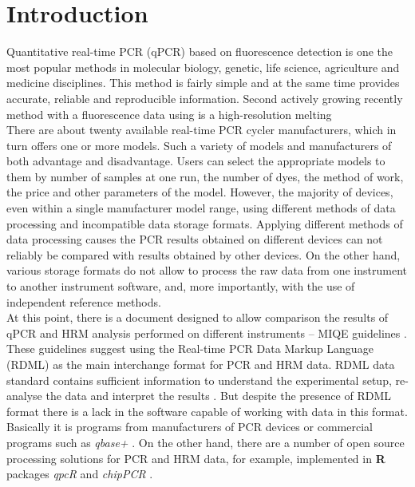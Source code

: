 \documentclass{bioinfo}
\begin{document}
\section{Introduction}

Quantitative real-time PCR (qPCR) based on fluorescence detection is one the 
most popular methods in molecular biology, genetic, life science, agriculture 
and medicine disciplines. This method is fairly simple and at the same time 
provides accurate, reliable and reproducible 
information\cite{kubista_real-time_2006}. Second actively growing recently 
method with a fluorescence data using is a high-resolution melting 
\cite{reed_high-resolution_2007}\cite{wittwer_high-resolution_2009}\\
There are about twenty available real-time PCR cycler manufacturers, which in 
turn offers one or more models. Such a variety of models and manufacturers of 
both advantage and disadvantage. Users can select the appropriate models to them 
by number of samples at one run, the number of dyes, the method of work, the 
price and other parameters of the model. However, the majority of devices, even 
within a single manufacturer model range, using different methods of data 
processing and incompatible data storage formats. Applying different methods of 
data processing causes the PCR results obtained on different devices can not 
reliably be compared with results obtained by other devices. On the other hand, 
various storage formats do not allow to process the raw data from one instrument 
to another instrument software, and, more importantly, with the use of 
independent reference methods.\\
At this point, there is a document designed to allow comparison the results of 
qPCR and HRM analysis performed on different instruments -- MIQE guidelines 
\cite{bustin_miqe_2009, huggett_2013}. These guidelines suggest using the 
Real-time PCR Data Markup Language (RDML) as the main interchange format for PCR 
and HRM data. RDML data standard contains sufficient information to understand 
the experimental setup, re-analyse the data and interpret the results 
\cite{lefever_rdml:_2009}. But despite the presence of RDML format there is a 
lack in the software capable of working with data in this format. Basically it 
is programs from manufacturers of PCR devices or commercial programs such as 
\textit{qbase+} \cite{rdml}. On the other hand, there are a number of open 
source processing solutions for PCR and HRM data, for example, implemented in 
\textbf{R} packages \textit{qpcR}\cite{ritz_qpcr:_2008} and \textit{chipPCR} 
\cite{roediger_chippcr_2014}.\\
\end{document}
